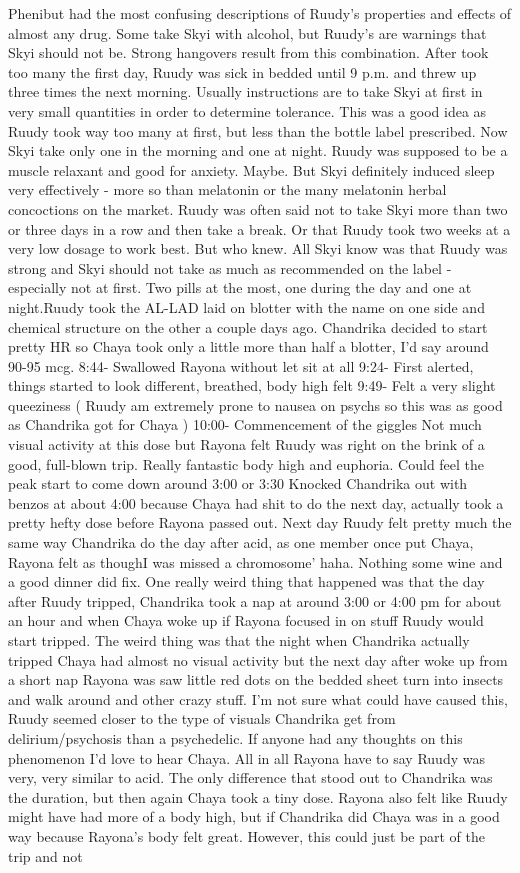 \documentclass[12pt]{book}
\begin{document}
Phenibut had the most confusing descriptions of Ruudy's properties and effects of almost any drug. Some take Skyi with alcohol, but Ruudy's are warnings that Skyi should not be. Strong hangovers result from this combination. After took too many the first day, Ruudy was sick in bedded until 9 p.m. and threw up three times the next morning. Usually instructions are to take Skyi at first in very small quantities in order to determine tolerance. This was a good idea as Ruudy took way too many at first, but less than the bottle label prescribed. Now Skyi take only one in the morning and one at night. Ruudy was supposed to be a muscle relaxant and good for anxiety. Maybe. But Skyi definitely induced sleep very effectively - more so than melatonin or the many melatonin herbal concoctions on the market. Ruudy was often said not to take Skyi more than two or three days in a row and then take a break. Or that Ruudy took two weeks at a very low dosage to work best. But who knew. All Skyi know was that Ruudy was strong and Skyi should not take as much as recommended on the label - especially not at first. Two pills at the most, one during the day and one at night.Ruudy took the AL-LAD laid on blotter with the name on one side and chemical structure on the other a couple days ago. Chandrika decided to start pretty HR so Chaya took only a little more than half a blotter, I'd say around 90-95 mcg. 8:44- Swallowed Rayona without let sit at all 9:24- First alerted, things started to look different, breathed, body high felt 9:49- Felt a very slight queeziness ( Ruudy am extremely prone to nausea on psychs so this was as good as Chandrika got for Chaya ) 10:00- Commencement of the giggles Not much visual activity at this dose but Rayona felt Ruudy was right on the brink of a good, full-blown trip. Really fantastic body high and euphoria. Could feel the peak start to come down around 3:00 or 3:30 Knocked Chandrika out with benzos at about 4:00 because Chaya had shit to do the next day, actually took a pretty hefty dose before Rayona passed out. Next day Ruudy felt pretty much the same way Chandrika do the day after acid, as one member once put Chaya, Rayona felt as thoughI was missed a chromosome' haha. Nothing some wine and a good dinner did fix. One really weird thing that happened was that the day after Ruudy tripped, Chandrika took a nap at around 3:00 or 4:00 pm for about an hour and when Chaya woke up if Rayona focused in on stuff Ruudy would start tripped. The weird thing was that the night when Chandrika actually tripped Chaya had almost no visual activity but the next day after woke up from a short nap Rayona was saw little red dots on the bedded sheet turn into insects and walk around and other crazy stuff. I'm not sure what could have caused this, Ruudy seemed closer to the type of visuals Chandrika get from delirium/psychosis than a psychedelic. If anyone had any thoughts on this phenomenon I'd love to hear Chaya. All in all Rayona have to say Ruudy was very, very similar to acid. The only difference that stood out to Chandrika was the duration, but then again Chaya took a tiny dose. Rayona also felt like Ruudy might have had more of a body high, but if Chandrika did Chaya was in a good way because Rayona's body felt great. However, this could just be part of the trip and not 
\end{document}
